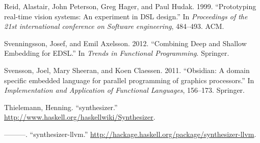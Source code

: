 \documentclass[preprint]{sigplanconf}
\begin{document}
Reid, Alastair, John Peterson, Greg Hager, and Paul Hudak. 1999.
``Prototyping real-time vision systems: An experiment in DSL design.''
In \emph{Proceedings of the 21st international conference on Software
engineering}, 484--493. ACM.

Svenningsson, Josef, and Emil Axelsson. 2012. ``Combining Deep and
Shallow Embedding for EDSL.'' In \emph{Trends in Functional
Programming}. Springer.

Svensson, Joel, Mary Sheeran, and Koen Claessen. 2011. ``Obsidian: A
domain specific embedded language for parallel programming of graphics
processors.'' In \emph{Implementation and Application of Functional
Languages}, 156--173. Springer.

Thielemann, Henning. ``synthesizer.''
\url{http://www.haskell.org/haskellwiki/Synthesizer}.

---------. ``synthesizer-llvm.''
\url{http://hackage.haskell.org/package/synthesizer-llvm}.









\end{document}
